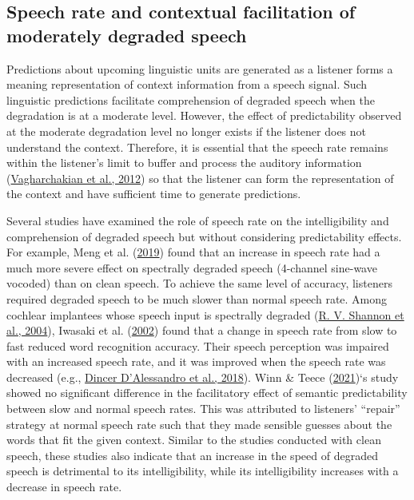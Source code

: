 \documentclass[a4paper, nobind]{templates/ociamthesis}
\begin{document}
\hypertarget{speech-rate-and-contextual-facilitation-of-moderately-degraded-speech}{%
\subsection{Speech rate and contextual facilitation of moderately degraded speech}\label{speech-rate-and-contextual-facilitation-of-moderately-degraded-speech}}

Predictions about upcoming linguistic units are generated as a listener forms a meaning representation of context information from a speech signal. Such linguistic predictions facilitate comprehension of degraded speech when the degradation is at a moderate level.
However, the effect of predictability observed at the moderate degradation level no longer exists if the listener does not understand the context.
Therefore, it is essential that the speech rate remains within the listener's limit to buffer and process the auditory information (\protect\hyperlink{ref-Vagharchakian2012}{Vagharchakian et al., 2012}) so that the listener can form the representation of the context and have sufficient time to generate predictions.

Several studies have examined the role of speech rate on the intelligibility and comprehension of degraded speech but without considering predictability effects.
For example, Meng et al. (\protect\hyperlink{ref-Meng2019}{2019}) found that an increase in speech rate had a much more severe effect on spectrally degraded speech (4-channel sine-wave vocoded) than on clean speech.
To achieve the same level of accuracy, listeners required degraded speech to be much slower than normal speech rate.
Among cochlear implantees whose speech input is spectrally degraded (\protect\hyperlink{ref-Shannon2004}{R. V. Shannon et al., 2004}), Iwasaki et al. (\protect\hyperlink{ref-Iwasaki2002}{2002}) found that a change in speech rate from slow to fast reduced word recognition accuracy.
Their speech perception was impaired with an increased speech rate, and it was improved when the speech rate was decreased (e.g., \protect\hyperlink{ref-Dincer2018}{Dincer D'Alessandro et al., 2018}).
Winn \& Teece (\protect\hyperlink{ref-Winn2021}{2021})`s study showed no significant difference in the facilitatory effect of semantic predictability between slow and normal speech rates.
This was attributed to listeners' ``repair'' strategy at normal speech rate such that they made sensible guesses about the words that fit the given context.
Similar to the studies conducted with clean speech, these studies also indicate that an increase in the speed of degraded speech is detrimental to its intelligibility, while its intelligibility increases with a decrease in speech rate.
\end{document}
